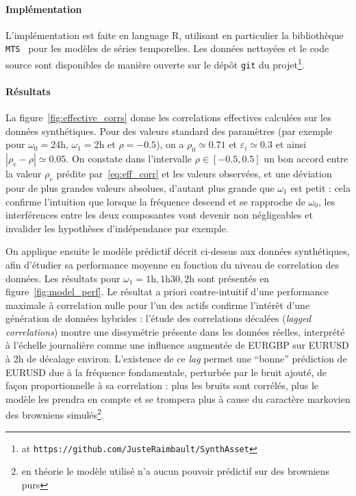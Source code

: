 \paragraph{Implémentation}

L'implémentation est faite en language R, utilisant en particulier la bibliothèque \texttt{MTS}~\cite{Tsay:2015xy} pour les modèles de séries temporelles. Les données nettoyées et le code source sont disponibles de manière ouverte sur le dépôt \texttt{git} du projet\footnote{at \texttt{https://github.com/JusteRaimbault/SynthAsset}}.

\paragraph{Résultats}









La figure~\ref{fig:effective_corrs} donne les correlations effectives calculées sur les données synthétiques. Pour des valeurs standard des paramètres (par exemple pour $\omega_0=24\textrm{h}$, $\omega_1=2\textrm{h}$ et $\rho=-0.5$), on a $\rho_0\simeq 0.71$ et $\varepsilon_i \simeq 0.3$ et ainsi $\left| \rho_e - \rho \right|\simeq 0.05$. On constate dans l'intervalle $\rho \in [-0.5,0.5]$ un bon accord entre la valeur $\rho_e$ prédite par~\ref{eq:eff_corr} et les valeurs observées, et une déviation pour de plus grandes valeurs absolues, d'autant plus grande que $\omega_1$ est petit : cela confirme l'intuition que lorsque la fréquence descend et se rapproche de $\omega_0$, les interférences entre les deux composantes vont devenir non négligeables et invalider les hypothèses d'indépendance par exemple.

On applique ensuite le modèle prédictif décrit ci-dessus aux données synthétiques, afin d'étudier sa performance moyenne en fonction du niveau de correlation des données. Les résultats pour $\omega_1 = 1\textrm{h},1\textrm{h}30,2\textrm{h}$ sont présentés en figure~\ref{fig:model_perf}. Le résultat a priori contre-intuitif d'une performance maximale à correlation nulle pour l'un des actifs confirme l'intérêt d'une génération de données hybrides : l'étude des correlations décalées (\emph{lagged correlations}) montre une dissymétrie présente dans les données réelles, interprété à l'échelle journalière comme une influence augmentée de EURGBP sur EURUSD à 2h de décalage environ. L'existence de ce \emph{lag} permet une ``bonne'' prédiction de EURUSD due à la fréquence fondamentale, perturbée par le bruit ajouté, de façon proportionnelle à sa correlation : plus les bruits sont corrélés, plus le modèle les prendra en compte et se trompera plus à cause du caractère markovien des browniens simulés\footnote{en théorie le modèle utilisé n'a aucun pouvoir prédictif sur des browniens purs}.

